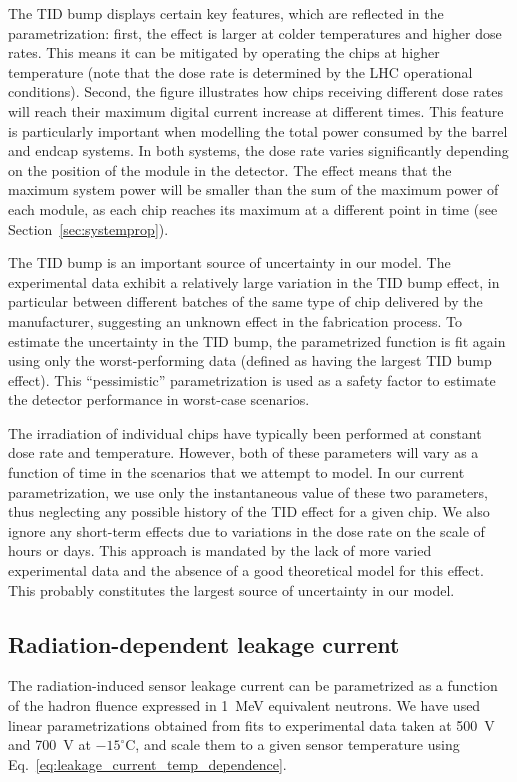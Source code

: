 The TID bump displays certain key features, which are reflected in the parametrization:
first, the effect is larger at colder temperatures and higher dose rates. This means it can be
mitigated by operating the chips at higher temperature (note that the dose rate is determined by the LHC operational conditions).
Second, the figure illustrates how chips receiving different dose rates will reach their maximum
digital current increase at different times. This feature is particularly important when modelling the
total power consumed by the barrel and endcap systems. In both systems, the dose rate varies significantly
depending on the position of the module in the detector. The effect means that the maximum system
power will be smaller than the sum of the maximum power of each module, as each chip reaches
its maximum at a different point in time (see Section~\ref{sec:systemprop}).

The TID bump is an important source of uncertainty in our model. The experimental data exhibit
a relatively large variation in the TID bump effect, in particular
between different batches of the same type of chip delivered by the manufacturer, suggesting an unknown
effect in the fabrication process. To estimate the uncertainty in the TID bump,
the parametrized function is fit again using only the worst-performing data (defined as having the
largest TID bump effect). This ``pessimistic'' parametrization is used as a safety factor to estimate
the detector performance in worst-case scenarios.

The irradiation of individual chips have typically been performed at constant dose rate and temperature.
However, both of these parameters will vary as a function of time in the scenarios that we attempt to model.
In our current parametrization, we use only the instantaneous value of these two parameters, thus neglecting any possible history of the TID effect for a given chip. We also ignore any short-term effects due to variations in the dose rate on the scale of hours or days. This approach is mandated by the lack of more varied experimental data and the absence of a good theoretical model for this effect. This probably constitutes the largest source of uncertainty in our model.

\subsection{Radiation-dependent leakage current}

The radiation-induced sensor leakage current can be parametrized as a function of the hadron fluence expressed in 1~MeV equivalent neutrons.
We have used linear parametrizations obtained from fits to experimental data taken at 500~V and 700~V at $-15^\circ$C, and scale them to a given sensor temperature using Eq.~\ref{eq:leakage_current_temp_dependence}.


